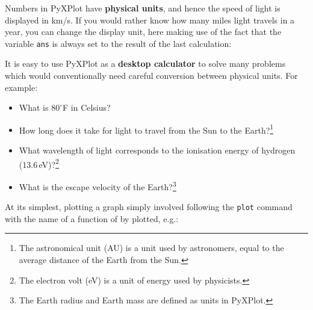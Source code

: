 \noindent Numbers in PyXPlot have {\bf physical units}, and hence the speed of
light is displayed in km/s. If you would rather know how many miles light
travels in a year, you can change the display unit, here making use of the fact
that the variable {\tt ans} is always set to the result of the last
calculation:

\vspace{3mm}

\vspace{3mm}

\noindent It is easy to use PyXPlot as a {\bf desktop calculator} to solve many
problems which would conventionally need careful conversion between physical
units. For example:

\begin{itemize}
\item What is $80^\circ$F in Celsius?

\vspace{3mm}

\vspace{3mm}

\item How long does it take for light to travel from the Sun to the
Earth?\footnote{The astronomical unit (AU) is a unit used by astronomers, equal
to the average distance of the Earth from the Sun.}

\vspace{3mm}

\vspace{3mm}

\item What wavelength of light corresponds to the ionisation energy of hydrogen
(13.6\,eV)?\footnote{The electron volt (eV) is a unit of energy used by
physicists.}

\vspace{3mm}

\vspace{3mm}

\item What is the escape velocity of the Earth?\footnote{The Earth radius and
Earth mass are defined as units in PyXPlot.}

\vspace{3mm}

\vspace{3mm}
\end{itemize}


At its simplest, plotting a graph simply involved following the {\tt plot}
command with the name of a function of by plotted, e.g.:

